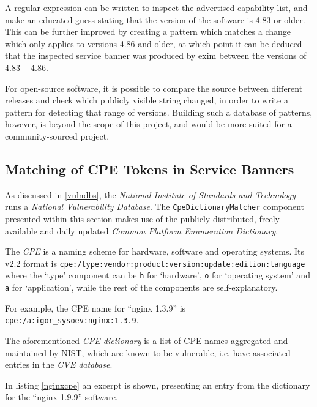 \documentclass[a4paper,12pt]{article}
\begin{document}
	A regular expression can be written to inspect the advertised capability list, and make an educated guess stating that the version of the software is 4.83 or older. This can be further improved by creating a pattern which matches a change which only applies to versions 4.86 and older, at which point it can be deduced that the inspected service banner was produced by exim between the versions of $4.83-4.86$.
	
	For open-source software, it is possible to compare the source between different releases and check which publicly visible string changed, in order to write a pattern for detecting that range of versions. Building such a database of patterns, however, is beyond the scope of this project, and would be more suited for a community-sourced project.
	
\subsection{Matching of CPE Tokens in Service Banners} \label{matchcpe}
 

	As discussed in \ref{vulndbs}, the \textit{National Institute of Standards and Technology} runs a \textit{National Vulnerability Database}. The \texttt{CpeDictionaryMatcher} component presented within this section makes use of the publicly distributed, freely available and daily updated \textit{Common Platform Enumeration Dictionary}.
	
	The \textit{CPE} is a naming scheme for hardware, software and operating systems\cite{cpe22}. Its v2.2 format is \texttt{cpe:/type:vendor:product:version:update:edition:language} where the `type' component can be \texttt{h} for `hardware', \texttt{o} for `operating system' and \texttt{a} for `application', while the rest of the components are self-explanatory.
	
	For example, the CPE name for ``nginx 1.3.9'' is \texttt{cpe:/a:igor_sysoev:nginx:1.3.9}.
	
	The aforementioned \textit{CPE dictionary} is a list of CPE names aggregated and maintained by NIST, which are known to be vulnerable, i.e. have associated entries in the \textit{CVE database}.
	
	In listing \ref{nginxcpe} an excerpt is shown, presenting an entry from the dictionary for the ``nginx 1.9.9'' software.
	
\end{document}
